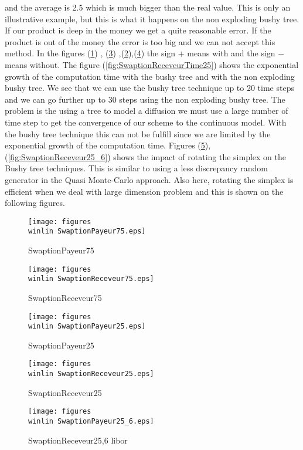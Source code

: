 and the average is 2.5 which is much bigger than the real value. This is only an illustrative example, but this is what it happens on the non exploding bushy tree. If our product is deep in the money we get a quite reasonable error. If the product is out of the money the error is too big and we can not accept this method. In the figures (\ref{fig:SwaptionPayeur75}) , (\ref{fig:SwaptionPayeur25}) ,(\ref{fig:SwaptionReceveur75}),(\ref{fig:SwaptionReceveur25}) the sign $+$ means with and the sign $-$ means without. The figure (\ref{fig:SwaptionReceveurTime25}) shows the exponential growth of the computation time with the bushy tree and with the non exploding bushy tree. We see that we can use the bushy tree technique up to 20 time steps and we can go further up to 30 steps using the non exploding bushy tree. The problem is the using a tree to model a diffusion we must use a large number of time step to get the convergence of our scheme to the continuous model. With the bushy tree technique this can not be fulfill since we are limited by the exponential growth of the computation time. Figures (\ref{fig:SwaptionPayeur25_6}),(\ref{fig:SwaptionReceveur25_6}) shows the impact of rotating the simplex on the Bushy tree techniques. This is similar to using a less discrepancy random generator in the Quasi Monte-Carlo approach. Also here, rotating the simplex is efficient when we deal with large dimension problem and this is shown on the following figures.
\begin{figure}[htbp]
	\centering
		\texttt{[image: figures\\winlin SwaptionPayeur75.eps]}
	\caption{SwaptionPayeur75}
	\label{fig:SwaptionPayeur75}
\end{figure}
\begin{figure}[htbp]
	\centering
		\texttt{[image: figures\\winlin SwaptionReceveur75.eps]}
	\caption{SwaptionReceveur75}
	\label{fig:SwaptionReceveur75}
\end{figure}
\begin{figure}[htbp]
	\centering
		\texttt{[image: figures\\winlin SwaptionPayeur25.eps]}
	\caption{SwaptionPayeur25}
	\label{fig:SwaptionPayeur25}
\end{figure}
\begin{figure}[htbp]
	\centering
		\texttt{[image: figures\\winlin SwaptionReceveur25.eps]}
	\caption{SwaptionReceveur25}
	\label{fig:SwaptionReceveur25}
\end{figure}
\begin{figure}[htbp]
	\centering
		\texttt{[image: figures\\winlin SwaptionPayeur25\_6.eps]}
	\caption{SwaptionReceveur25,6 libor}
	\label{fig:SwaptionPayeur25_6}
\end{figure}
